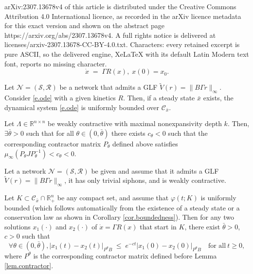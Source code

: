 \documentclass[10pt,a4paper]{amsart}
\newcommand\bx{{\bar x}}
\newcommand{\Cs}{\mathscr C}
\newcommand{\Ns}{{\mathscr N}}
\newcommand{\Rs}{{\mathscr R}}
\newcommand{\Ss}{{\mathscr S}}
\newcommand{\tV}{{\widetilde{V}}}
\begin{document}
arXiv:2307.13678v4 of this article is distributed under the Creative Commons Attribution 4.0 International licence, as recorded in the arXiv licence metadata for this exact version and shown on the abstract page https://arxiv.org/abs/2307.13678v4. A full rights notice is delivered at licenses/arxiv-2307.13678-CC-BY-4.0.txt. Characters: every retained excerpt is pure ASCII, so the delivered engine, XeLaTeX with its default Latin Modern text font, reports no missing character.
\begin{equation}\label{e.ode}
 	\dot x \; = \; \Gamma R(x), \;x(0)=x_0.
\end{equation}

\begin{corollary}\label{cor.boundedness}
Let $\Ns=(\Ss,\Rs)$ be a network that admits a GLF $\tV(r)=\|B\Gamma r\|_\infty$. Consider \eqref{e.ode} with a given kinetics $R$. Then, if a steady state $\bx$ exists, the dynamical system \eqref{e.ode} is uniformly bounded over $\Cs_\bx$. 
\end{corollary}

\begin{lemma}\label{lem.contractor}
	Let $\Lambda \in \mathbb R^{n \times n}$ be weakly contractive with maximal nonexpansivity depth $k$. Then, $\exists \bar\theta>0$ such that  for all $ \theta \in (0,\bar\theta)$ there exists $c_\theta<0$ such that the corresponding  contractor matrix $P_\theta$ defined above satisfies $\mu_{\infty}(P_\theta JP_\theta^{-1})<c_\theta <0$.
	\end{lemma}

\begin{theorem}\label{th.scalednorm}
	Let a network $\Ns=(\Ss,\Rs)$ be given and assume that it admits a GLF $\tV(r)=\|B\Gamma r\|_\infty$, it has only trivial siphons, and is weakly contractive.
	
	Let $K\subset \Cs_\bx \cap \mathbb R_+^n$ be any compact set, and assume that $\varphi(t;K)$ is uniformly bounded (which follows automa{t}ically from the existence of a steady state or a conservation law as shown in Corollary \ref{cor.boundedness}). Then
	for any two solutions $x_1(\cdot)$ and $x_2(\cdot)$ of $\dot x=\Gamma R(x)$ that start in $K$, there exist $\bar\theta>0$, $c>0$ such that
	\[
	{\forall \theta \in (0,\bar\theta)}, |x_1(t)-x_2(t)|_{P^{{\theta}}B} \;\leq\; e^{-ct}|x_1(0)-x_2(0)|_{P^{{\theta}}B} \quad \mbox{for all}\ t\geq0,
	\]
	where $P^{{\theta}}$ is the corresponding contractor matrix defined before Lemma \ref{lem.contractor}.
\end{theorem}
\end{document}
